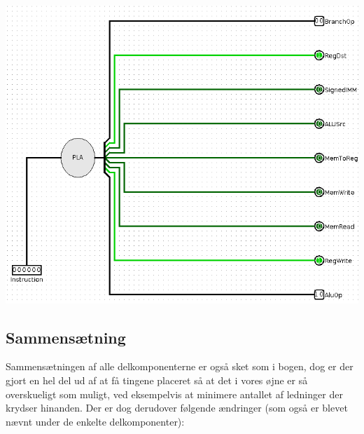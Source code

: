 \includegraphics[angle=90,scale=0.75]{Billeder/single_cycle_control.png}

\subsection{Sammensætning}
Sammensætningen af alle delkomponenterne er også sket som i bogen, dog er der
gjort en hel del ud af at få tingene placeret så at det i vores øjne er så
overskueligt som muligt, ved eksempelvis at minimere antallet af ledninger der
krydser hinanden. Der er dog derudover følgende ændringer (som også er blevet
nævnt under de enkelte delkomponenter):

